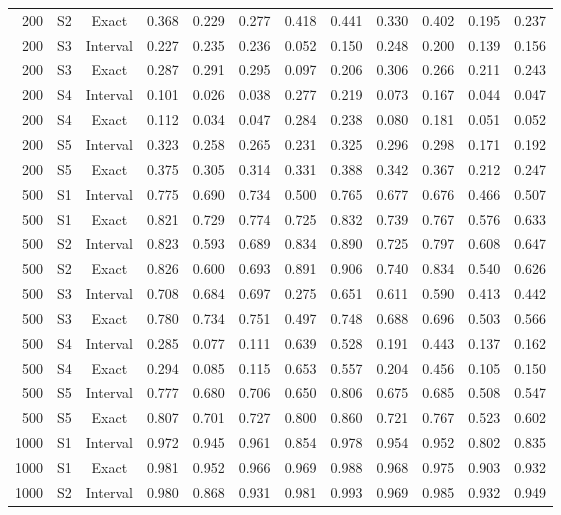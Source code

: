 \documentclass[12pt]{article}
\theoremstyle{definition}
\theoremstyle{remark}
\begin{document}
\begin{longtable}{rccrrrrrrrrr}
200 & S2 & Exact & 0.368 & 0.229 & 0.277 & 0.418 & 0.441 & 0.330 & 0.402 & 0.195 & 0.237 \\
200 & S3 & Interval & 0.227 & 0.235 & 0.236 & 0.052 & 0.150 & 0.248 & 0.200 & 0.139 & 0.156 \\
200 & S3 & Exact & 0.287 & 0.291 & 0.295 & 0.097 & 0.206 & 0.306 & 0.266 & 0.211 & 0.243 \\
200 & S4 & Interval & 0.101 & 0.026 & 0.038 & 0.277 & 0.219 & 0.073 & 0.167 & 0.044 & 0.047 \\
200 & S4 & Exact & 0.112 & 0.034 & 0.047 & 0.284 & 0.238 & 0.080 & 0.181 & 0.051 & 0.052 \\
200 & S5 & Interval & 0.323 & 0.258 & 0.265 & 0.231 & 0.325 & 0.296 & 0.298 & 0.171 & 0.192 \\
200 & S5 & Exact & 0.375 & 0.305 & 0.314 & 0.331 & 0.388 & 0.342 & 0.367 & 0.212 & 0.247 \\
500 & S1 & Interval & 0.775 & 0.690 & 0.734 & 0.500 & 0.765 & 0.677 & 0.676 & 0.466 & 0.507 \\
500 & S1 & Exact & 0.821 & 0.729 & 0.774 & 0.725 & 0.832 & 0.739 & 0.767 & 0.576 & 0.633 \\
500 & S2 & Interval & 0.823 & 0.593 & 0.689 & 0.834 & 0.890 & 0.725 & 0.797 & 0.608 & 0.647 \\
500 & S2 & Exact & 0.826 & 0.600 & 0.693 & 0.891 & 0.906 & 0.740 & 0.834 & 0.540 & 0.626 \\
500 & S3 & Interval & 0.708 & 0.684 & 0.697 & 0.275 & 0.651 & 0.611 & 0.590 & 0.413 & 0.442 \\
500 & S3 & Exact & 0.780 & 0.734 & 0.751 & 0.497 & 0.748 & 0.688 & 0.696 & 0.503 & 0.566 \\
500 & S4 & Interval & 0.285 & 0.077 & 0.111 & 0.639 & 0.528 & 0.191 & 0.443 & 0.137 & 0.162 \\
500 & S4 & Exact & 0.294 & 0.085 & 0.115 & 0.653 & 0.557 & 0.204 & 0.456 & 0.105 & 0.150 \\
500 & S5 & Interval & 0.777 & 0.680 & 0.706 & 0.650 & 0.806 & 0.675 & 0.685 & 0.508 & 0.547 \\
500 & S5 & Exact & 0.807 & 0.701 & 0.727 & 0.800 & 0.860 & 0.721 & 0.767 & 0.523 & 0.602 \\
1000 & S1 & Interval & 0.972 & 0.945 & 0.961 & 0.854 & 0.978 & 0.954 & 0.952 & 0.802 & 0.835 \\
1000 & S1 & Exact & 0.981 & 0.952 & 0.966 & 0.969 & 0.988 & 0.968 & 0.975 & 0.903 & 0.932 \\
1000 & S2 & Interval & 0.980 & 0.868 & 0.931 & 0.981 & 0.993 & 0.969 & 0.985 & 0.932 & 0.949 \\

\end{longtable}
\end{document}

